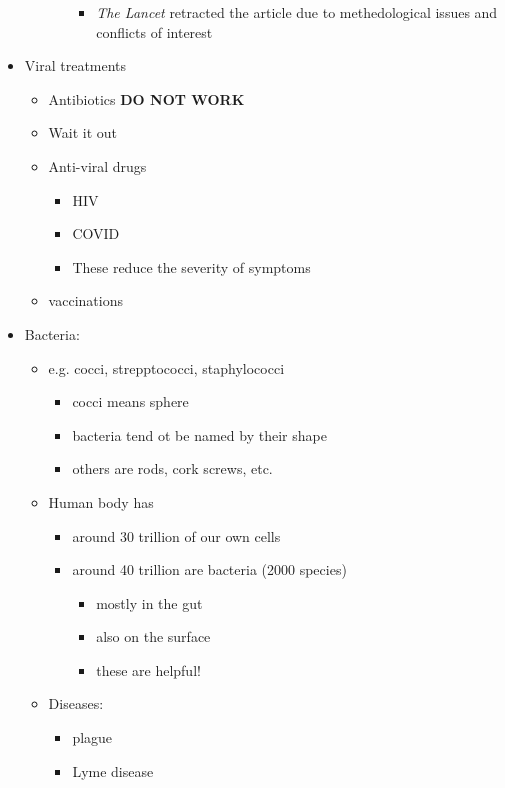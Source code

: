 \documentclass{article}
\theoremstyle{definition}
\begin{document}
\begin{itemize}
\begin{itemize}
\begin{itemize}
\begin{itemize}
							\item \textit{The Lancet} retracted the article due to methedological issues and conflicts of interest
						\end{itemize}
				\end{itemize}
		\end{itemize}
	\item Viral treatments
		\begin{itemize}
			\item  Antibiotics \textbf{DO NOT WORK} 
			\item Wait it out
			\item Anti-viral drugs
				\begin{itemize}
					\item HIV
					\item COVID
					\item These reduce the severity of symptoms
				\end{itemize}
			\item vaccinations
		\end{itemize}
	\item Bacteria:
		\begin{itemize}
			\item e.g. cocci, strepptococci, staphylococci 
				\begin{itemize}
					\item cocci means sphere
					\item bacteria tend ot be named by their shape
					\item others are rods, cork screws, etc.
				\end{itemize}
			\item Human body has
				\begin{itemize}
					\item around 30 trillion of our own cells
					\item around 40 trillion are bacteria (2000 species)
						\begin{itemize}
							\item mostly in the gut
							\item also on the surface
							\item these are helpful!
						\end{itemize}
				\end{itemize}
			\item Diseases:
				\begin{itemize}
					\item plague
					\item Lyme disease

\end{itemize}
\end{itemize}
\end{itemize}
\end{document}
